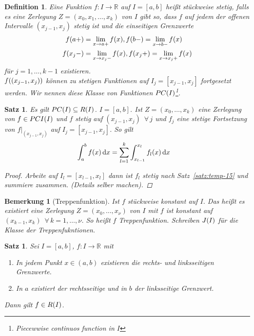\documentclass[11pt, twoside, a4paper]{article}
\theoremstyle{plain}
\newtheorem{bemerkung}[blockelement]{Bemerkung}
\newtheorem{definition}[blockelement]{Definition}
\newtheorem{satz}[blockelement]{Satz}
\newcommand{\pair}[1]{\left(#1\right)}
\newcommand{\of}[1]{\mathopen{}\mathclose{}\bgroup\left(#1\aftergroup\egroup\right)}
\newcommand{\interv}[1]{\left[#1\right]}
\newcommand{\fromto}{\rightarrow{}}
\newcommand{\dif}{\mathop{}\!\mathrm{d}}
\newcommand{\fa}{\;\forall\,}
\newcommand{\R}{\mathbb{R}}
\begin{document}
    \begin{definition}
        Eine Funktion $f: I\fromto\R$ auf $I=\interv{a,b}$ heißt stückweise stetig, falls es eine Zerlegung $Z = \pair{x_0, x_1, \dots, x_k}$ von $I$ gibt so, dass $f$ auf jedem der offenen Intervalle $\pair{x_{j-1}, x_j}$ stetig ist und die einseitigen Grenzwerte
        \begin{align*}
            f\of{a+} &= \lim_{x\fromto a+} f\of{x}, f\of{b-} = \lim_{x\fromto b-} f\of{x}\\
            f\of{x_j-} &= \lim_{x\fromto x_j-} f\of{x}, f\of{x_j+} = \lim_{x\fromto x_j+} f\of{x}
        \end{align*}
        für $j=1, \dots, k-1$ existieren.\\
        $f\of{\pair{x_{j-1}, x_j}}$ können zu stetigen Funktionen auf $I_j=\interv{x_{j-1}, x_j}$ fortgesetzt werden. Wir nennen diese Klasse von Funktionen $PC\of{I}$\footnote{Piecewwise continuos function in $I$}.
    \end{definition}
    
    \begin{satz} %
        Es gilt $PC\of{I} \subseteq R\of{I}$. $I=\interv{a,b}$. Ist $Z=\pair{x_0, \dots, x_k}$ eine Zerlegung von $f\in PCI\of{I}$ und $f$ stetig auf $\pair{x_{j-1}, x_j}~\fa j$ und $f_j$ eine stetige Fortsetzung von $f\vert_{\pair{x_{j-1}, x_j}}$ auf $I_j = \interv{x_{j-1}, x_j}$. So gilt
        \begin{align*}
            \int_{a}^{b} f\of{x} \dif x &= \sum_{l=1}^{k} \int_{x_{l-1}}^{x_l} f_l\of{x}\dif x
        \end{align*}
        \begin{proof}
            Arbeite auf $I_l = \interv{x_{l-1}, x_{l}}$ dann ist $f_l$ stetig nach Satz~\ref{satz:temp-15} und summiere zusammen. (Details selber machen).
        \end{proof}
    \end{satz}

    \begin{bemerkung}[Treppenfunktion]
        Ist $f$ stückweise konstant auf $I$. Das heißt es existiert eine Zerlegung $Z=\pair{x_0, \dots, x_{\nu}}$ von $I$ mit $f$ ist konstant auf $\pair{x_{k-1}, x_k}~\fa k=1, \dots, \nu$. So heißt $f$ Treppenfunktion. Schreiben $J\of{I}$ für die Klasse der Treppenfukntionen.
    \end{bemerkung}

    \begin{satz} %
        Sei $I=\interv{a,b}$, $f: I\fromto\R$ mit
        \begin{enumerate}[label=(\alph*)]
            \item In jedem Punkt $x\in\pair{a,b}$ existieren die rechts- und linksseitigen Grenzwerte.
            \item In $a$ existiert der rechtsseitige und in $b$ der linksseitige Grenzwert.
        \end{enumerate}
        Dann gilt $f\in R\of{I}$.
    \end{satz}
\end{document}
